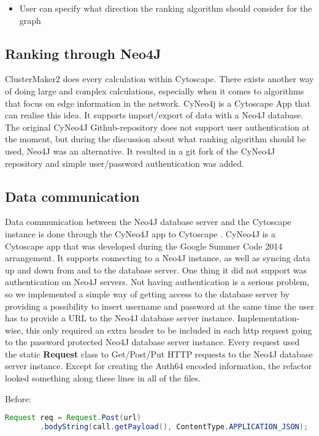 \begin{itemize}
    \item User can specify what direction the ranking algorithm should consider
        for the graph
\end{itemize}

\subsection{Ranking through Neo4J}
ClusterMaker2 does every calculation within Cytoscape. There exists another way
of doing large and complex calculations, especially when it comes to algorithms
that focus on edge information in the network. CyNeo4j\cite{cyneo4j} is
a Cytoscape App that can realise this idea. It supports import/export of data
with a Neo4J\cite{neo4j} database. The original CyNeo4J Github-repository does
not support user authentication at the moment, but during the discussion about
what ranking algorithm should be used, Neo4J was an alternative. It resulted in
a git fork\cite{git-fork} of the CyNeo4J repository and simple user/password
authentication was added.

\subsection{Data communication}
Data communication between the Neo4J database server and the Cytoscape instance
is done through the CyNeo4J app to Cytoscape \cite{cyneo4j}. CyNeo4J is a
Cytoscape app that was developed during the Google Summer Code 2014 arrangement.
It supports connecting to a Neo4J instance, as well as syncing data up and down
from and to the database server. One thing it did not support was authentication
on Neo4J servers. Not having authentication is a serious problem, so we
implemented a simple way of getting access to the database server by providing a
possibility to insert username and password at the same time the user has to
provide a URL to the Neo4J database server instance. Implementation-wise, this
only required an extra header to be included in each http request going to the
password protected Neo4J database server instance. Every request used the static
\textbf{Request} class to Get/Post/Put HTTP requests to the Neo4J database
server instance. Except for creating the Auth64 encoded information, the
refactor looked something along these lines in all of the files.

Before:
\begin{lstlisting}[frame=single,language=Java]
Request req = Request.Post(url)
        .bodyString(call.getPayload(), ContentType.APPLICATION_JSON);
\end{lstlisting}

